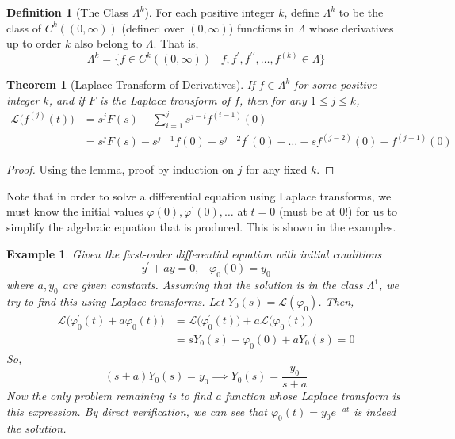 \documentclass{article}
\newtheorem{theorem}{Theorem}[section]
\newtheorem{example}{Example}[section]
\theoremstyle{remark}
\theoremstyle{definition}
\newtheorem{definition}{Definition}[section]
\begin{document}
\begin{definition}[The Class $\Lambda^k$]
For each positive integer $k$, define $\Lambda^k$ to be the class of $C^k((0, \infty))$ (defined over $(0, \infty)$) functions in $\Lambda$ whose derivatives up to order $k$ also belong to $\Lambda$. That is, 
\[\Lambda^k = \{f \in C^k((0, \infty))\;|\; f, f^\prime, f^{\prime\prime}, \ldots, f^{(k)} \in \Lambda \}\]
\end{definition}

\begin{theorem}[Laplace Transform of Derivatives]
If $f \in \Lambda^k$ for some positive integer $k$, and if $F$ is the Laplace transform of $f$, then for any $1 \leq j \leq k$, 
\begin{align*}
    \mathcal{L}\big( f^{(j)} (t) \big) & = s^j F(s) - \sum_{i=1}^j s^{j-i} f^{(i-1)}(0) \\
    & = s^j F(s) - s^{j-1} f(0) - s^{j-2} f^\prime (0) - \ldots - s f^{(j-2)}(0) - f^{(j-1)} (0)
\end{align*}
\end{theorem}
\begin{proof}
Using the lemma, proof by induction on $j$ for any fixed $k$. 
\end{proof}

Note that in order to solve a differential equation using Laplace transforms, we must know the initial values $\varphi(0), \varphi^\prime (0), \ldots$ at $t = 0$ (must be at $0$!) for us to simplify the algebraic equation that is produced. This is shown in the examples. 

\begin{example}
Given the first-order differential equation with initial conditions
\[y^\prime + a y = 0, \;\;\; \varphi_0 (0) = y_0\]
where $a, y_0$ are given constants. Assuming that the solution is in the class $\Lambda^1$, we try to find this using Laplace transforms. Let $Y_0 (s) = \mathcal{L}( \varphi_0)$. Then,
\begin{align*}
    \mathcal{L}\big(\varphi_0^\prime (t) + a \varphi_0 (t)\big) & = \mathcal{L}\big(\varphi_0^\prime (t)\big) + a \mathcal{L}\big(\varphi_0 (t)\big) \\
    & = s Y_0 (s) - \varphi_0 (0) + a Y_0 (s) = 0
\end{align*}
So, 
\[(s+a) Y_0 (s) = y_0 \implies Y_0 (s) = \frac{y_0}{s+a}\]
Now the only problem remaining is to find a function whose Laplace transform is this expression. By direct verification, we can see that $\varphi_0 (t) = y_0 e^{-at}$ is indeed the solution. 
\end{example}
\end{document}
